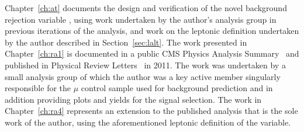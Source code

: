 Chapter~\ref{ch:at} documents the design and verification of the novel background rejection variable \alt, using work undertaken by the author's analysis group in previous iterations of the analysis, and work on the leptonic definition undertaken by the author described in Section~\ref{sec:lalt}. The work presented in Chapter~\ref{ch:ra1} is documented in a public CMS Physics Analysis Summary~\cite{1fbnote} and published in Physical Review Letters~\cite{PRL1fb} in 2011. The work was undertaken by a small analysis group of which the author was a key active member singularly responsible for the $\mu$ control sample used for background prediction and in addition providing plots and yields for the signal selection. The work in Chapter~\ref{ch:ra4} represents an extension to the published analysis that is the sole work of the author, using the aforementioned leptonic definition of the \alt variable. 


